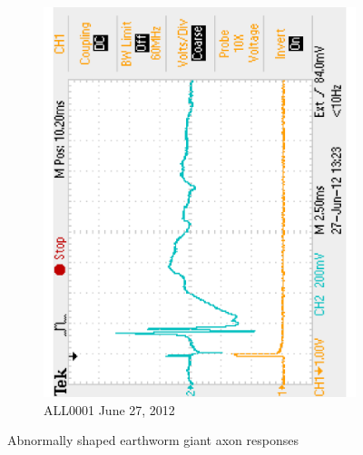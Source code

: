 \begin{figure}[H]
\begin{singlespace}
\begin{subfigure}[b]{0.48\textwidth}
		\includegraphics[trim=0 0.1in 0 0.1in,clip,clip,angle=-90,width=\textwidth]{./figures/F0001TEK_abnorm_120627} %
	\caption{ALL0001 June 27, 2012}
	\end{subfigure}
	\caption{Abnormally shaped earthworm giant axon responses\label{fig:abnormal}}
	\end{singlespace}
\end{figure}

